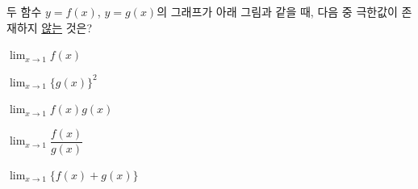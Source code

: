 두 함수 $y=f(x)$, $y=g(x)$의 그래프가 아래 그림과 같을 때, 다음 중 극한값이 존재하지 \underline{않는} 것은?
\par\smallskip\begin{center}\resizebox{\ifdim\width>\linewidth\linewidth\else\width\fi}{!}{}\end{center}
\begin{choicesii}{\rule[-3ex]{0pt}{8ex}$\displaystyle\lim_{x\to 1} f(x)$}{\rule[-3ex]{0pt}{8ex}$\displaystyle\lim_{x\to 1}\{g(x)\}^2$}{\rule[-3ex]{0pt}{8ex}$\displaystyle\lim_{x\to 1} f(x)g(x)$}{\rule[-3ex]{0pt}{8ex}$\displaystyle\lim_{x\to 1}\dfrac{f(x)}{g(x)}$}{\rule[-3ex]{0pt}{8ex}$\displaystyle\lim_{x\to 1}\{f(x)+g(x)\}$}\end{choicesii}
